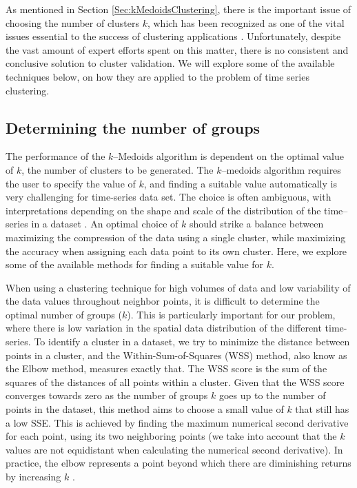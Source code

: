 As mentioned in Section \ref{Sec:kMedoidsClustering}, there is the important issue of choosing the number of clusters $k$, which has been recognized as one of the vital issues essential to the success of clustering applications \cite{Aggarwal2013}. Unfortunately, despite the vast amount of expert efforts spent on this matter, there is no consistent and conclusive solution to cluster validation. We will explore some of the available techniques below, on how they are applied to the problem of time series clustering.

\subsection{Determining the number of groups}
\label{Sec:domain_number_groups}

The performance of the $k$--Medoids algorithm is dependent on the optimal value of $k$, the number of clusters to be generated. The $k$--medoids algorithm requires the user to specify the value of $k$, and finding a suitable value automatically is very challenging for time-series data set. The choice is often ambiguous, with interpretations depending on the shape and scale of the distribution of the time--series in a dataset \cite{Liao2005}. An optimal choice of $k$ should strike a balance between maximizing the compression of the data using a single cluster, while maximizing the accuracy when assigning each data point to its own cluster. Here, we explore some of the available methods for finding a suitable value for $k$.

When using a clustering technique for high volumes of data and low variability of the data values throughout neighbor points, it is difficult to determine the optimal number of groups ($k$). This is particularly important for our problem, where there is low variation in the spatial data distribution of the different time-series. 
To identify a cluster in a dataset, we try to minimize the distance between points in a cluster, and the Within-Sum-of-Squares (WSS) method, also know as the Elbow method, measures exactly that. The WSS score is the sum of the squares of the distances of all points within a cluster. Given that the WSS score converges towards zero as the number of groups $k$ goes up to the number of points in the dataset, this method aims to choose a small value of $k$ that still has a low SSE. This is achieved by finding the maximum numerical second derivative for each point, using its two neighboring points (we take into account that the $k$ values are not equidistant when calculating the numerical second derivative). In practice, the elbow represents a point beyond which there are diminishing returns by increasing $k$ \cite{Han2011}.

